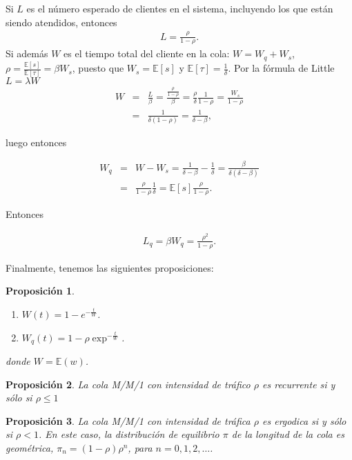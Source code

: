 \documentclass{article}
\newtheorem{Prop}{Proposición}[section]
\newcommand{\esp}{\mathbb{E}}
\numberwithin{equation}{section}
\begin{document}
Si $L$ es el n\'umero esperado de clientes en el sistema, incluyendo los que est\'an siendo atendidos, entonces
\begin{eqnarray}
L=\frac{\rho}{1-\rho}.
\end{eqnarray}
Si adem\'as $W$ es el tiempo total del cliente en la cola: $W=W_{q}+W_{s}$, $\rho=\frac{\esp\left[s\right]}{\esp\left[\tau\right]}=\beta W_{s}$, puesto que $W_{s}=\esp\left[s\right]$ y $\esp\left[\tau\right]=\frac{1}{\delta}$. Por la f\'ormula de Little $L=\lambda W$
\begin{eqnarray*}
W&=&\frac{L}{\beta}=\frac{\frac{\rho}{1-\rho}}{\beta}=\frac{\rho}{\delta}\frac{1}{1-\rho}=\frac{W_{s}}{1-\rho}\\
&=&\frac{1}{\delta\left(1-\rho\right)}=\frac{1}{\delta-\beta},
\end{eqnarray*}

luego entonces

\begin{eqnarray*}
W_{q}&=&W-W_{s}=\frac{1}{\delta-\beta}-\frac{1}{\delta}=\frac{\beta}{\delta(\delta-\beta)}\\
&=&\frac{\rho}{1-\rho}\frac{1}{\delta}=\esp\left[s\right]\frac{\rho}{1-\rho}.
\end{eqnarray*}

Entonces

\begin{eqnarray*}
L_{q}=\beta W_{q}=\frac{\rho^{2}}{1-\rho}.
\end{eqnarray*}

Finalmente, tenemos las siguientes proposiciones:

\begin{Prop}
\begin{enumerate}
\item $W\left(t\right)=1-e^{-\frac{t}{W}}$.
\item $W_{q}\left(t\right)=1-\rho\exp^{-\frac{t}{W}}$.
\end{enumerate}
donde $W=\esp(w)$.
\end{Prop}

\begin{Prop}
La cola M/M/1 con intensidad de tr\'afico $\rho$ es recurrente si
y s\'olo si $\rho\leq1$
\end{Prop}

\begin{Prop}
La cola M/M/1 con intensidad de tr\'afica $\rho$ es ergodica si y
s\'olo si $\rho<1$. En este caso, la distribuci\'on de equilibrio
$\pi$ de la longitud de la cola es geom\'etrica,
$\pi_{n}=\left(1-\rho\right)\rho^{n}$, para $n=0,1,2,\ldots$.
\end{Prop}
%
\end{document}
